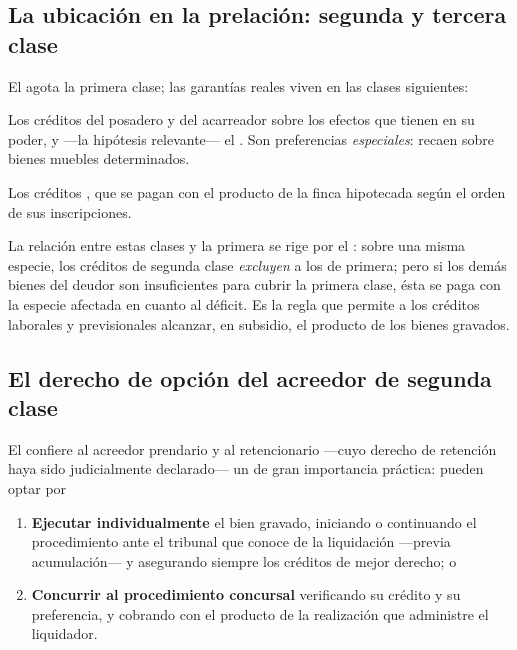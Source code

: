 \subsection{La ubicación en la prelación: segunda y tercera clase}

El  agota la primera clase; las garantías reales viven en las clases siguientes:

\begin{description}[leftmargin=0pt,style=nextline,font=\sffamily\bfseries]
  \item[Segunda clase (\artcc{2474})] Los créditos del posadero y del acarreador sobre los efectos
  que tienen en su poder, y ---la hipótesis relevante--- el . Son preferencias \emph{especiales}: recaen sobre bienes muebles determinados.
  \item[Tercera clase (\artcc{2477})] Los créditos , que se pagan con el
  producto de la finca hipotecada según el orden de sus inscripciones.
\end{description}

La relación entre estas clases y la primera se rige por el : sobre una misma especie,
los créditos de segunda clase \emph{excluyen} a los de primera; pero si los demás bienes del deudor
son insuficientes para cubrir la primera clase, ésta se paga con la especie afectada en cuanto al
déficit. Es la regla que permite a los créditos laborales y previsionales alcanzar, en subsidio, el
producto de los bienes gravados.

\bloqueNormativo

\subsection{El derecho de opción del acreedor de segunda clase}

El  confiere al acreedor prendario y al retencionario ---cuyo derecho de retención haya
sido judicialmente declarado--- un  de gran importancia práctica: pueden
optar por

\begin{enumerate}
  \item \textbf{Ejecutar individualmente} el bien gravado, iniciando o continuando el procedimiento
  ante el tribunal que conoce de la liquidación ---previa acumulación--- y asegurando siempre los
  créditos de mejor derecho; o
  \item \textbf{Concurrir al procedimiento concursal} verificando su crédito y su preferencia, y
  cobrando con el producto de la realización que administre el liquidador.
\end{enumerate}

